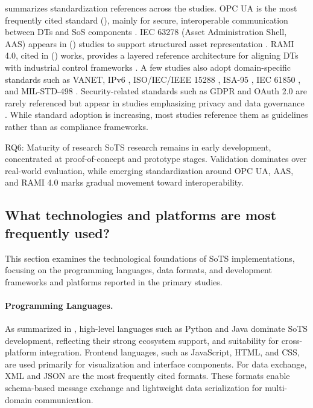  summarizes standardization references across the studies.
OPC UA is the most frequently cited standard (), mainly for secure, interoperable communication between DTs and SoS components \cite{dobie2024network, joseph2021aggregated}. IEC 63278 (Asset Administration Shell, AAS) appears in () studies to support structured asset representation \cite{gill2022method, gollner2022collaborative}. RAMI 4.0, cited in () works, provides a layered reference architecture for aligning DTs with industrial control frameworks \cite{binder2021utilizing}. A few studies also adopt domain-specific standards such as VANET, IPv6 \cite{alam2017c2ps}, ISO/IEC/IEEE 15288 \cite{altamiranda2019system}, ISA-95 \cite{dobie2024network}, IEC 61850 \cite{jiang2022novel}, and MIL-STD-498 \cite{parri2019jarvis, parri2021framework}. Security-related standards such as GDPR and OAuth 2.0 are rarely referenced but appear in studies emphasizing privacy and data governance \cite{stary2022privacy, human2023design, jiang2022novel}. While standard adoption is increasing, most studies reference them as guidelines rather than as compliance frameworks.

\begin{conclusionframe}{RQ6: Maturity of research}
SoTS research remains in early development, concentrated at proof-of-concept and prototype stages. Validation dominates over real-world evaluation, while emerging standardization around OPC UA, AAS, and RAMI 4.0 marks gradual movement toward interoperability.
\end{conclusionframe}


\subsection{What technologies and platforms are most frequently used?}\label{subsec:literature-review-results-rq7}
This section examines the technological foundations of SoTS implementations, focusing on the programming languages, data formats, and development frameworks and platforms reported in the primary studies.


\paragraph{Programming Languages.}
As summarized in , high-level languages such as Python and Java dominate SoTS development, reflecting their strong ecosystem support, and suitability for cross-platform integration. Frontend languages, such as JavaScript, HTML, and CSS, are used primarily for visualization and interface components.
For data exchange, XML and JSON are the most frequently cited formats. These formats enable schema-based message exchange and lightweight data serialization for multi-domain communication.


